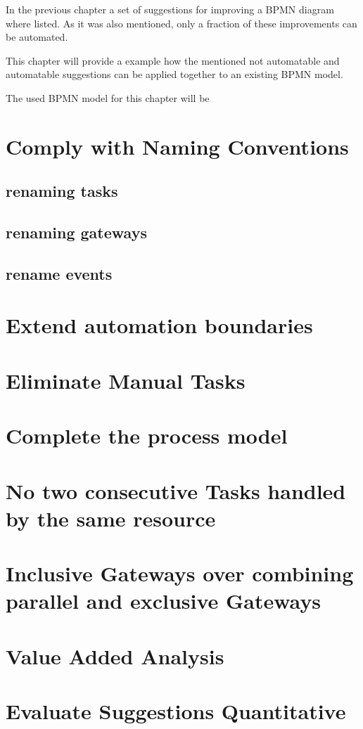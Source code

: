 In the previous chapter a set of suggestions for improving a BPMN diagram where listed. As it was also mentioned, only a fraction of these improvements can be automated. 

This chapter will provide a example how the mentioned not automatable and automatable suggestions can be applied together to an existing BPMN model. 

The used BPMN model for this chapter will be  
\section{Comply with Naming Conventions}
\subsection{renaming tasks}
\subsection{renaming gateways}
\subsection{rename events}

\section{Extend automation boundaries}

\section{Eliminate Manual Tasks}

\section{Complete the process model}

\section{No two consecutive Tasks handled by the same resource}

\section{Inclusive Gateways over combining parallel and exclusive Gateways}

\section{Value Added Analysis}

\section{Evaluate Suggestions Quantitative}

